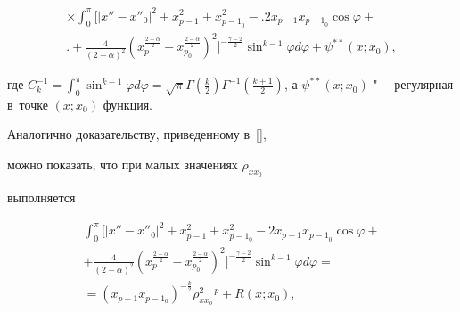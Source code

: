 \begin{multline}


\label{chebotareva:eq8} \times \int_0^\pi \biggl[


\left| {x''-x''_0 } \right|^2 +


x_{p - 1}^2 + x_{{p - 1}_0 }^2 -\biggr. 2x_{p - 1} x_{{p - 1}_0} \cos\varphi+\\


\biggl. +\frac{4}{\left(2 -


\alpha \right)^2}\left( x_p^{\frac{2 - \alpha }{2}} -


x_{p_0}^{\frac{2 - \alpha }{2}} \right)^2 \biggr] ^{ -


\frac{\gamma - 2}{2}}\sin ^{k - 1}\varphi d\varphi + \psi ^{\ast


\ast }\left( {x; x_0} \right), 


\end{multline}


где $C_k^{ - 1} = {\displaystyle \int_0^\pi} {\sin ^{k - 1}\varphi d\varphi


= \sqrt \pi \Gamma \left( {\frac{k}{2}} \right)\Gamma ^{ -


1}\left( {\frac{k + 1}{2}} \right)} $,  а $\psi ^{\ast \ast }\left(


{x; x_0 } \right)$ "--- регулярная в~точке $\left( {x; x_0 }


\right)$ функция.





Аналогично доказательству,  приведенному в~[],


можно показать,  что при малых значениях $\rho _{xx_0 }$


выполняется


\begin{multline*}


\int_0^\pi \biggl[ \left| {x''-x''_0 } \right|^2 + x_{p -


1}^2 + x_{{p - 1}_0 }^2 -2x_{p - 1} x_{{p - 1}_0}


\cos\varphi+ \\ + \frac{4}{\left(2 - \alpha \right)^2}\left(


x_p^{\frac{2 - \alpha }{2}} - x_{p_0}^{\frac{2 - \alpha }{2}}


\right)^2 \biggr] ^{ - \frac{\gamma - 2}{2}}\sin ^{k - 1}\varphi


d\varphi = \\


=\left( {x_{p - 1} x_{p - 1_0 } } \right)^{-\frac{k}{2}}\rho


_{xx_o }^{2 - p} + R\left( {x; x_0 } \right), 


\end{multline*}


